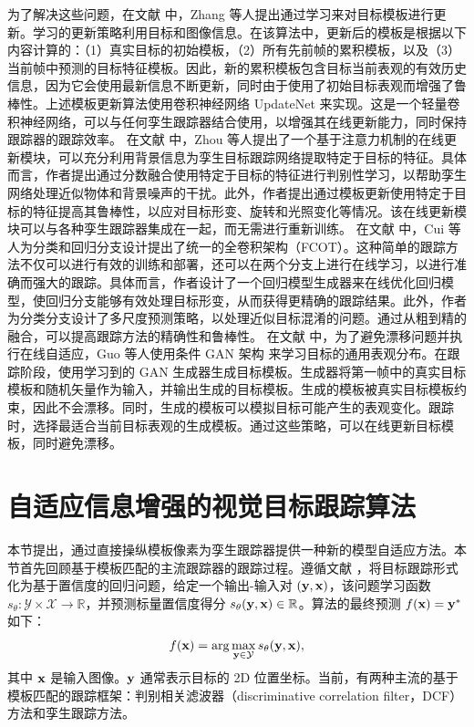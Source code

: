 为了解决这些问题，在文献 \cite{Zhang_2019_ICCV} 中，Zhang 等人提出通过学习来对目标模板进行更新。学习的更新策略利用目标和图像信息。在该算法中，更新后的模板是根据以下内容计算的：（1）真实目标的初始模板，（2）所有先前帧的累积模板，以及（3）当前帧中预测的目标特征模板。因此，新的累积模板包含目标当前表观的有效历史信息，因为它会使用最新信息不断更新，同时由于使用了初始目标表观而增强了鲁棒性。上述模板更新算法使用卷积神经网络 UpdateNet 来实现。这是一个轻量卷积神经网络，可以与任何孪生跟踪器结合使用，以增强其在线更新能力，同时保持跟踪器的跟踪效率。
在文献 \cite{DiscriminativeAnd} 中，Zhou 等人提出了一个基于注意力机制的在线更新模块，可以充分利用背景信息为孪生目标跟踪网络提取特定于目标的特征。具体而言，作者提出通过分数融合使用特定于目标的特征进行判别性学习，以帮助孪生网络处理近似物体和背景噪声的干扰。此外，作者提出通过模板更新使用特定于目标的特征提高其鲁棒性，以应对目标形变、旋转和光照变化等情况。该在线更新模块可以与各种孪生跟踪器集成在一起，而无需进行重新训练。%
在文献 \cite{FCOT} 中，Cui 等人为分类和回归分支设计提出了统一的全卷积架构（FCOT）。这种简单的跟踪方法不仅可以进行有效的训练和部署，还可以在两个分支上进行在线学习，以进行准确而强大的跟踪。具体而言，作者设计了一个回归模型生成器来在线优化回归模型，使回归分支能够有效处理目标形变，从而获得更精确的跟踪结果。此外，作者为分类分支设计了多尺度预测策略，以处理近似目标混淆的问题。通过从粗到精的融合，可以提高跟踪方法的精确性和鲁棒性。 %
在文献 \cite{TGGAN} 中，为了避免漂移问题并执行在线自适应，Guo 等人使用条件 GAN 架构 \cite{cGAN} 来学习目标的通用表观分布。在跟踪阶段，使用学习到的 GAN 生成器生成目标模板。生成器将第一帧中的真实目标模板和随机矢量作为输入，并输出生成的目标模板。生成的模板被真实目标模板约束，因此不会漂移。同时，生成的模板可以模拟目标可能产生的表观变化。跟踪时，选择最适合当前目标表观的生成模板。通过这些策略，可以在线更新目标模板，同时避免漂移。%

\section{自适应信息增强的视觉目标跟踪算法}
本节提出，通过直接操纵模板像素为孪生跟踪器提供一种新的模型自适应方法。本节首先回顾基于模板匹配的主流跟踪器的跟踪过程。遵循文献 \cite{Danelljan_2020_CVPR}，将目标跟踪形式化为基于置信度的回归问题，给定一个输出-输入对 $(\textbf y,\textbf x)$，该问题学习函数 $s_\theta:\mathcal{Y\times X\rightarrow \mathbb R}$，并预测标量置信度得分 $s_\theta(\textbf y,\textbf x)\in\mathbb R$。算法的最终预测 $f(\textbf x)=\textbf y^*$ 如下：
\begin{equation}
    f(\textbf x) = \arg\max_{\textbf y\in \mathcal Y}s_\theta (\textbf y,\textbf x),
\end{equation}
其中 $\textbf x$ 是输入图像。$\textbf y$ 通常表示目标的 2D 位置坐标。当前，有两种主流的基于模板匹配的跟踪框架：判别相关滤波器（discriminative correlation filter，DCF）方法和孪生跟踪方法。

